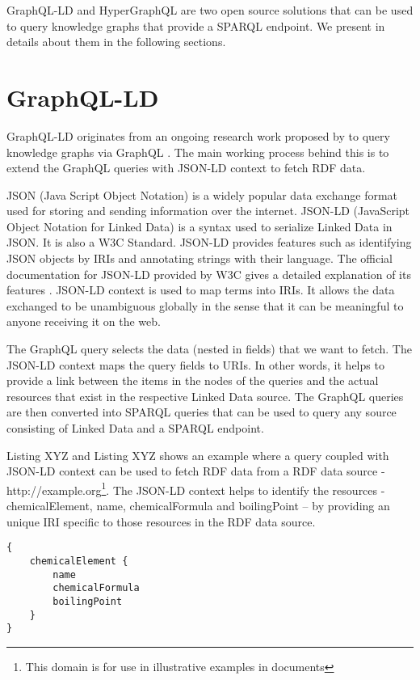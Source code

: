 GraphQL-LD and HyperGraphQL are two open source solutions that can be used to query knowledge graphs that provide a SPARQL endpoint. We present in details about them in the following sections.

\section{GraphQL-LD}

GraphQL-LD originates from an ongoing research work proposed by \citeauthor{Taelman2018} to query knowledge graphs via GraphQL \cite{Taelman2018}. The main working process behind this is to extend the GraphQL queries with JSON-LD context to fetch RDF data. 

JSON (Java Script Object Notation) is a widely popular data exchange format used for storing and sending information over the internet. JSON-LD (JavaScript Object Notation for Linked Data) is a syntax used to serialize Linked Data in JSON. It is also a W3C Standard. JSON-LD provides features such as identifying JSON objects by IRIs and annotating strings with their language. The official documentation for JSON-LD provided by W3C gives a detailed explanation of its features \cite{Sporny2014}. JSON-LD context is used to map terms into IRIs. It allows the data exchanged to be unambiguous globally in the sense that it can be meaningful to anyone receiving it on the web.   

The GraphQL query selects the data (nested in fields) that we want to fetch. The JSON-LD context maps the query fields to URIs. In other words, it helps to provide a link between the items in the nodes of the queries and the actual resources that exist in the respective Linked Data source. The GraphQL queries are then converted into SPARQL queries that can be used to query any source consisting of Linked Data and a SPARQL endpoint.

Listing XYZ and Listing XYZ shows an example where a query coupled with JSON-LD context can be used to fetch RDF data from a RDF data source - http://example.org\footnote{This domain is for use in illustrative examples in documents}. The JSON-LD context helps to identify the resources - chemicalElement, name, chemicalFormula and boilingPoint – by providing an unique IRI specific to those resources in the RDF data source.

\begin{minipage}{\linewidth}
\begin{lstlisting}[label=listing:listing6, caption={GraphQL query}]
{
	chemicalElement {
		name
		chemicalFormula
		boilingPoint
	}
}
\end{lstlisting}
\end{minipage}

